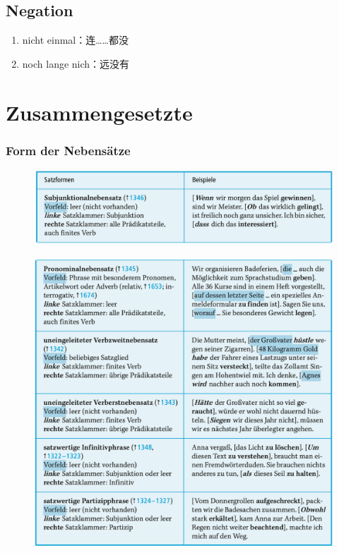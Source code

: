 \documentclass[UTF8]{report}
\begin{document}
\subsection{Negation}
\begin{enumerate}
    \item nicht einmal：连……都没
    \item noch lange nich：远没有
\end{enumerate}




\section{Zusammengesetzte}
\subsubsection{Form der Nebensätze}
\begin{figure}[H]
    \centering
    \includegraphics[scale=0.55]{nebens1.png}
\end{figure}
\begin{figure}[H]
    \centering
    \includegraphics[scale=0.6]{nebens2.png}
\end{figure}
\end{document}
